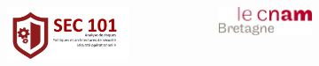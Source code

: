 \date[\uversion]{Date de publication\\ \DTMnow}




\begin{frame}[plain]
 					\begin{figure}
  					 \centering
  					 \begin{columns}[c]
  \begin{column}{0.4\textwidth}
  
    \begin{figure}
        \begin{centering}
  			\includegraphics[width=\textwidth]{../Tex/template.inc/Commons/CommonsPictures/img-sec101.pdf}
  \end{centering}
  \end{figure}
      \end{column}
  
  \begin{column}{0.6\textwidth}
    \begin{figure}
        \begin{centering}
 		    \includegraphics[width=\textwidth]{../Tex/template.inc/Commons/CommonsPictures/cnambretagne.pdf}
    \end{centering}
  \end{figure}
  \end{column}
\end{columns}
   							  
   							  \end{figure}
				  				\titlepage
\end{frame}


